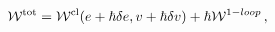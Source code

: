 \begin{equation}
{\cal W}^{\rm tot}={\cal W}^{\rm cl}(e+\hbar \delta e,v +\hbar\delta v)
+\hbar {\cal W}^{1-loop} \,,\label{Wtot} 
\end{equation}

